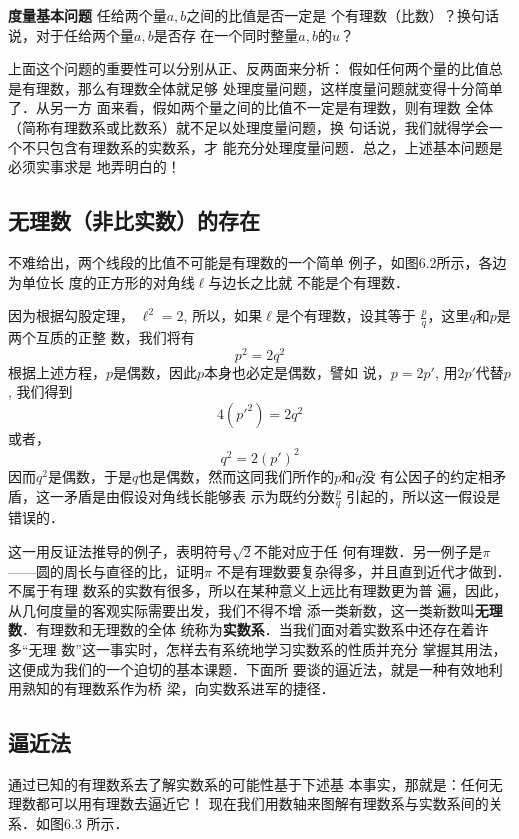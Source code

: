\textbf{度量基本问题 } 任给两个量$a,b$之间的比值是否一定是
个有理数（比数）？换句话说，对于任给两个量$a,b$是否存
在一个同时整量$a,b$的$u$？

上面这个问题的重要性可以分别从正、反两面来分析：
假如任何两个量的比值总是有理数，那么有理数全体就足够
处理度量问题，这样度量问题就变得十分简单了．从另一方
面来看，假如两个量之间的比值不一定是有理数，则有理数
全体（简称有理数系或比数系）就不足以处理度量问题，换
句话说，我们就得学会一个不只包含有理数系的实数系，才
能充分处理度量问题．总之，上述基本问题是必须实事求是
地弄明白的！

\subsection{无理数（非比实数）的存在}
不难给出，两个线段的比值不可能是有理数的一个简单
例子，如图6.2所示，各边为单位长
度的正方形的对角线$\ell$与边长之比就
不能是个有理数．
\begin{figure}[htp]
    \centering
{}
    \caption{}
\end{figure}

因为根据勾股定理，
$\ell^2=2$, 所以，如果$\ell$是个有理数，设其等于
$\frac{p}{q}$，这里$q$和$p$是两个互质的正整
数，我们将有
\[p^2=2q^2\]
根据上述方程，$p$是偶数，因此$p$本身也必定是偶数，譬如
说，$p=2p'$, 用$2p'$代替$p$, 我们得到
\[4({p'}^2)=2q^2\]
或者，
\[q^2=2(p')^2\]
因而$q^2$是偶数，于是$q$也是偶数，然而这同我们所作的$p$和$q$没
有公因子的约定相矛盾，这一矛盾是由假设对角线长能够表
示为既约分数$\frac{p}{q}$
引起的，所以这一假设是错误的．

这一用反证法推导的例子，表明符号$\sqrt{2}$不能对应于任
何有理数．另一例子是$\pi$——圆的周长与直径的比，证明$\pi$
不是有理数要复杂得多，并且直到近代才做到．不属于有理
数系的实数有很多，所以在某种意义上远比有理数更为普
遍，因此，从几何度量的客观实际需要出发，我们不得不增
添一类新数，这一类新数叫\textbf{无理数}．有理数和无理数的全体
统称为\textbf{实数系}．当我们面对着实数系中还存在着许多“无理
数”这一事实时，怎样去有系统地学习实数系的性质并充分
掌握其用法，这便成为我们的一个迫切的基本课题．下面所
要谈的逼近法，就是一种有效地利用熟知的有理数系作为桥
梁，向实数系进军的捷径．

\subsection{逼近法}
通过已知的有理数系去了解实数系的可能性基于下述基
本事实，那就是：任何无理数都可以用有理数去逼近它！
现在我们用数轴来图解有理数系与实数系间的关系．如图6.3
所示．

